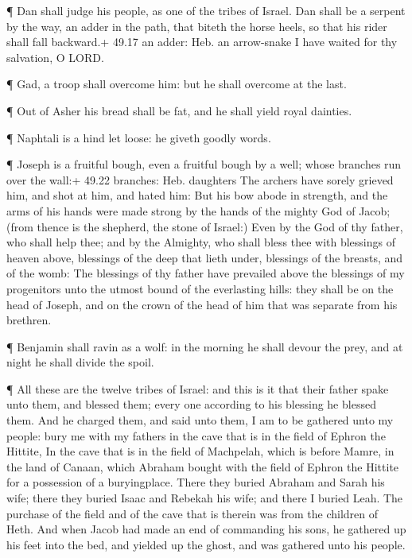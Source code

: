  ¶ Dan shall judge his people, as one of the tribes of
Israel.  Dan shall be a serpent by the way, an adder in the
path, that biteth the horse heels, so that his rider shall fall
backward.+ 49.17 an adder: Heb. an arrow-snake  I have
waited for thy salvation, O LORD.

 ¶ Gad, a troop shall overcome him: but he shall overcome
at the last.

 ¶ Out of Asher his bread shall be fat, and he shall yield
royal dainties.

 ¶ Naphtali is a hind let loose: he giveth goodly words.

 ¶ Joseph is a fruitful bough, even a fruitful bough by a
well; whose branches run over the wall:+ 49.22 branches: Heb. daughters
 The archers have sorely grieved him, and shot at him, and
hated him:  But his bow abode in strength, and the arms of
his hands were made strong by the hands of the mighty God of Jacob;
(from thence is the shepherd, the stone of Israel:)  Even
by the God of thy father, who shall help thee; and by the Almighty, who
shall bless thee with blessings of heaven above, blessings of the deep
that lieth under, blessings of the breasts, and of the womb:
 The blessings of thy father have prevailed above the
blessings of my progenitors unto the utmost bound of the everlasting
hills: they shall be on the head of Joseph, and on the crown of the head
of him that was separate from his brethren.

 ¶ Benjamin shall ravin as a wolf: in the morning he shall
devour the prey, and at night he shall divide the spoil.

 ¶ All these are the twelve tribes of Israel: and this is
it that their father spake unto them, and blessed them; every one
according to his blessing he blessed them.  And he charged
them, and said unto them, I am to be gathered unto my people: bury me
with my fathers in the cave that is in the field of Ephron the Hittite,
 In the cave that is in the field of Machpelah, which is
before Mamre, in the land of Canaan, which Abraham bought with the field
of Ephron the Hittite for a possession of a buryingplace. 
There they buried Abraham and Sarah his wife; there they buried Isaac
and Rebekah his wife; and there I buried Leah.  The
purchase of the field and of the cave that is therein was from the
children of Heth.  And when Jacob had made an end of
commanding his sons, he gathered up his feet into the bed, and yielded
up the ghost, and was gathered unto his people.

